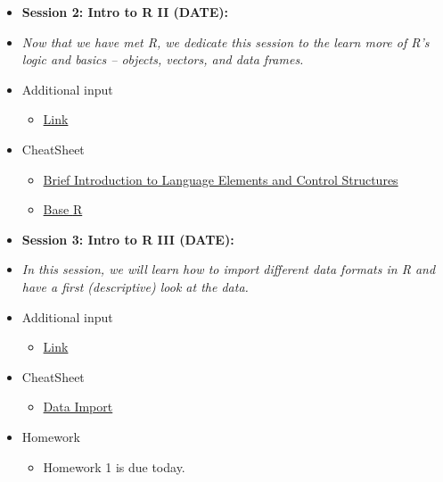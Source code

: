 \documentclass[12pt, a4paper]{article}
\begin{document}
\begin{itemize}
\vspace{0.5cm}
\item[] \textbf{Session 2: Intro to \textsf{R} II (DATE):}
\item[] \textit{Now that we have met \textsf{R}, we dedicate this session to the learn more of \textsf{R}'s logic and basics --  objects, vectors, and data frames.}
\item[] \faEdit \space Additional input
\begin{itemize} 
\item[$\square$] \href{url}{Link}
\end{itemize}
\item[] \faLightbulbO \space CheatSheet
\begin{itemize} 
\item[$\square$] \href{https://ugoproto.github.io/ugo_r_doc/R-Cheat-Sheet-Brief-Introduction-to-Language-Elements-and-Control-Structures.pdf}{Brief Introduction to Language Elements and Control Structures}
\item[$\square$] \href{https://www.rstudio.com/wp-content/uploads/2016/05/base-r.pdf}{Base \textsf{R}}
\end{itemize}

\item[] \textbf{Session 3: Intro to \textsf{R} III (DATE):}
\item[] \textit{In this session, we will learn how to import different data formats in \textsf{R} and have a first (descriptive) look at the data.}
\item[] \faEdit \space Additional input
\begin{itemize} 
\item[$\square$] \href{url}{Link}
\end{itemize}
\item[] \faLightbulbO \space CheatSheet
\begin{itemize} 
\item[$\square$] \href{https://ugoproto.github.io/ugo_r_doc/data-import.pdf}{Data Import}
\end{itemize}
\item[] \faExclamation \space Homework
\begin{itemize} 
\item[$\square$] Homework 1 is due today.
\end{itemize}


\end{itemize}
\end{document}
